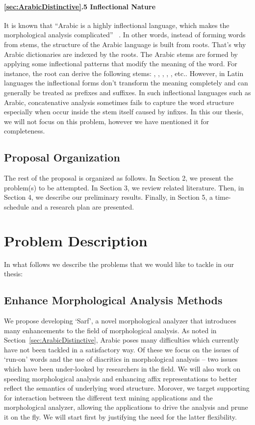 \documentclass[a4,12pt]{report}
\newcommand{\noVocRL}[1]{\transtrue\novocalize\RL{#1}\vocalize}
\begin{document}
\subsubsection{\ref*{sec:ArabicDistinctive}.5 Inflectional Nature}

	It is known that ``Arabic is a highly inflectional language, which makes the morphological
	analysis complicated'' ~\cite{Attia:08a}. In other words, instead of forming words from stems, the
	structure of the Arabic language is built from roots. That's why Arabic dictionaries are indexed by the roots.
	The Arabic stems are formed by applying some inflectional patterns that modify the meaning of the word.
	For instance, the root \noVocRL{drs} can derive the following stems: , , 
	, , , etc..
	However, in Latin languages the inflectional forms don't transform the meaning completely and can generally be treated
	as prefixes and suffixes. In such inflectional languages such as Arabic, concatenative analysis sometimes fails to capture the
	word structure especially when occur inside the stem itself caused by infixes. In this our thesis, we will not focus on this problem,
	however we have mentioned it for completeness. 


\section{Proposal Organization} %

The rest of the proposal is organized as follows. In Section 2, we present the problem(s) to be attempted. 
In Section 3, we review related literature. 
Then, in Section 4, we describe our preliminary results. 
Finally, in Section 5, a time-schedule and a research plan are presented.

\chapter{Problem Description}

In what follows we describe the problems that we would like to tackle in our thesis:

\section{Enhance Morphological Analysis Methods}

We propose developing `Sarf', a novel morphological analyzer that introduces many enhancements to the
field of morphological analysis. As noted in Section~\ref{sec:ArabicDistinctive}, 
Arabic poses many difficulties which currently 
have not been tackled in a satisfactory way. Of these we focus on the issues of `run-on' words and
the use of diacritics in morphological analysis -- two issues which have been under-looked by researchers in the field.
We will also work on speeding morphological analysis and 
enhancing affix representations to better reflect the semantics of underlying word structure.
Morover, we target supporting for interaction between the different text mining applications 
and the morphological analyzer, 
allowing the applications to drive the analysis and prune it on the fly. 
We will start first by justifying the need for the latter flexibility.
\end{document}
